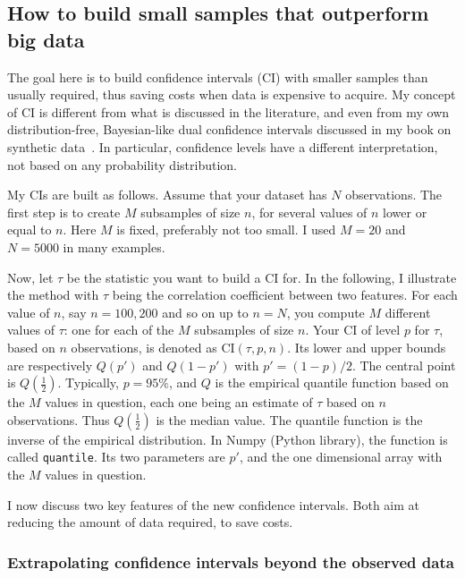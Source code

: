 \documentclass[oneside,10pt]{book}
\begin{document}
\subsection{How to build small samples that outperform big data}\label{trwsd}

The goal here is to build confidence intervals (CI) with smaller samples than usually required, thus saving costs when data is expensive to acquire. My  concept of CI is different from what is discussed in the literature, and even from my own distribution-free, Bayesian-like dual confidence intervals discussed in my book on synthetic data~\cite{vgelsevier}.  In particular, 
 \textcolor{index}{confidence levels} have a different interpretation, not based on any probability distribution.

My CIs are built as follows. Assume that your dataset has $N$ observations.   The first step is to create $M$ subsamples of size $n$, 
  for several values of $n$ lower or equal to $n$. Here $M$ is fixed, preferably not too small. I used $M=20$ and $N=5000$ in many examples. 

Now, let $\tau$ be the statistic you want to build a CI for. In the following, I illustrate the method with $\tau$ being the correlation coefficient between two features. For each value of $n$, say $n=100, 200$ and so on up to $n=N$, you compute $M$ different values of $\tau$: one for each of the $M$ subsamples of size $n$.  Your CI of level $p$ for $\tau$, based on $n$ observations,  
is denoted as $\text{CI}(\tau, p, n)$.
 Its lower and upper bounds are respectively $Q(p')$ and $Q(1-p')$ with $p' = (1-p)/2$. The
 central point is $Q(\frac{1}{2})$. Typically, $p = 95\%$, and $Q$ is the 
 \textcolor{index}{empirical quantile function} based on the $M$ values in question, each one being an estimate of $\tau$ based on $n$ observations. Thus $Q(\frac{1}{2})$ is the median value.
The quantile function is the inverse of the \textcolor{index}{empirical distribution}.
 In Numpy (Python library), the function is called \texttt{quantile}. Its two parameters are $p'$, and the one dimensional array with the $M$ values in question.

I now discuss two key features of the new confidence intervals. Both aim at reducing the amount of data required, to save costs.

\subsubsection{Extrapolating confidence intervals beyond the observed data}\label{hgboutght}
\end{document}
